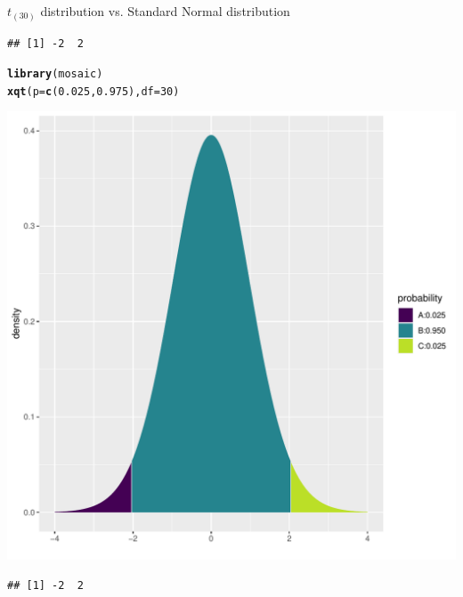 \documentclass[10pt,handout]{beamer}\usepackage[]{graphicx}\usepackage[]{color}
\makeatletter
\def\maxwidth{ %
  \ifdim\Gin@nat@width>\linewidth
    \linewidth
  \else
    \Gin@nat@width
  \fi
}
\newcommand{\hlnum}[1]{\textcolor[rgb]{0.686,0.059,0.569}{#1}}%
\newcommand{\hlstd}[1]{\textcolor[rgb]{0.345,0.345,0.345}{#1}}%
\newcommand{\hlkwc}[1]{\textcolor[rgb]{0.333,0.667,0.333}{#1}}%
\newcommand{\hlkwd}[1]{\textcolor[rgb]{0.737,0.353,0.396}{\textbf{#1}}}%
\newenvironment{kframe}{%
 \def\at@end@of@kframe{}%
 \ifinner\ifhmode%
  \def\at@end@of@kframe{\end{minipage}}%
  \begin{minipage}{\columnwidth}%
 \fi\fi%
 \def\FrameCommand##1{\hskip\@totalleftmargin \hskip-\fboxsep
 \colorbox{shadecolor}{##1}\hskip-\fboxsep
     \hskip-\linewidth \hskip-\@totalleftmargin \hskip\columnwidth}%
 \MakeFramed {\advance\hsize-\width
   \@totalleftmargin\z@ \linewidth\hsize
   \@setminipage}}%
 {\par\unskip\endMakeFramed%
 \at@end@of@kframe}
\newenvironment{knitrout}{}{} %
\makeatother
\begin{document}
\begin{frame}[fragile]{$t_{(30)}$ distribution vs. Standard Normal distribution}
\begin{minipage}{0.47\textwidth}
\begin{knitrout}
\begin{kframe}\begin{verbatim}
## [1] -2  2
\end{verbatim}
\end{kframe}
\end{knitrout}
	\end{minipage}
	\begin{minipage}{0.5\textwidth}
\begin{knitrout}\tiny
{}\color{fgcolor}\begin{kframe}
\begin{alltt}
\hlkwd{library}\hlstd{(mosaic)}
\hlkwd{xqt}\hlstd{(}\hlkwc{p} \hlstd{=} \hlkwd{c}\hlstd{(}\hlnum{0.025}\hlstd{,} \hlnum{0.975}\hlstd{),} \hlkwc{df} \hlstd{=} \hlnum{30}\hlstd{)}
\end{alltt}
\end{kframe}
\end{knitrout}
\begin{knitrout}\tiny
{}\color{fgcolor}

{\centering \includegraphics[width=\maxwidth]{figure/unnamed-chunk-7-1} 

}


\begin{kframe}\begin{verbatim}
## [1] -2  2
\end{verbatim}
\end{kframe}
\end{knitrout}
	\end{minipage}
\end{frame}
\end{document}
